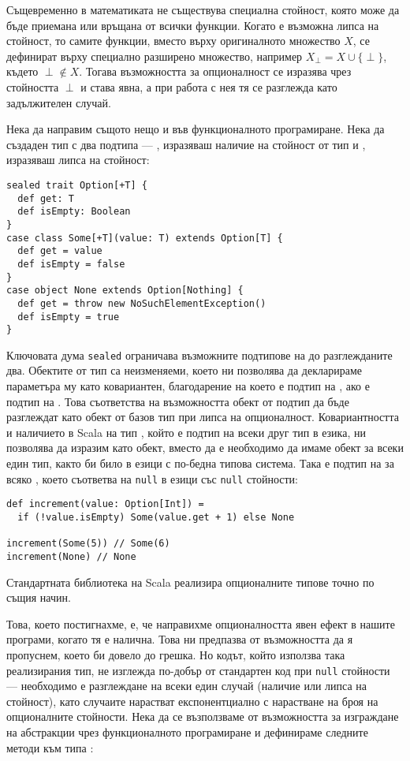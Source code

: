 Същевременно в математиката не съществува специална стойност, която може да бъде приемана или връщана от всички функции. Когато е възможна липса на стойност, то самите функции, вместо върху оригиналното множество $X$, се дефинират върху специално разширено множество, например $X_{\perp} = X \cup \{\perp\}$, където $\perp \notin X$. Тогава възможността за опционалност се изразява чрез стойността $\perp$ и става явна, а при работа с нея тя се разглежда като задължителен случай.

Нека да направим същото нещо и във функционалното програмиране. Нека да създаден тип  с два подтипа — , изразяваш наличие на стойност от тип  и , изразяваш липса на стойност:

\begin{lstlisting}
sealed trait Option[+T] {
  def get: T
  def isEmpty: Boolean
}
case class Some[+T](value: T) extends Option[T] {
  def get = value
  def isEmpty = false
}
case object None extends Option[Nothing] {
  def get = throw new NoSuchElementException()
  def isEmpty = true
}
\end{lstlisting}

Ключовата дума \lstinline|sealed| ограничава възможните подтипове на  до разглежданите два. Обектите от тип  са неизменяеми, което ни позволява да декларираме параметъра му  като ковариантен, благодарение на което  е подтип на , ако  е подтип на . Това съответства на възможността обект от подтип да бъде разглеждат като обект от базов тип при липса на опционалност. Ковариантността и наличието в Scala на тип , който е подтип на всеки друг тип в езика, ни позволява да изразим  като  обект, вместо да е необходимо да имаме  обект за всеки един тип, както би било в езици с по-бедна типова система. Така  е подтип на  за всяко , което съответва на \lstinline{null} в езици със \lstinline{null} стойности:

\begin{lstlisting}
def increment(value: Option[Int]) =
  if (!value.isEmpty) Some(value.get + 1) else None

increment(Some(5)) // Some(6)
increment(None) // None
\end{lstlisting}

Стандартната библиотека на Scala реализира опционалните типове точно по същия начин.

Това, което постигнахме, е, че направихме опционалността явен ефект в нашите програми, когато тя е налична. Това ни предпазва от възможността да я пропуснем, което би довело до грешка. Но кодът, който използва така реализирания  тип, не изглежда по-добър от стандартен код при \lstinline{null} стойности — необходимо е разглеждане на всеки един случай (наличие или липса на стойност), като случаите нарастват експонентциално с нарастване на броя на опционалните стойности. Нека да се възползваме от възможността за изграждане на абстракции чрез функционалното програмиране и дефинираме следните методи към типа :

